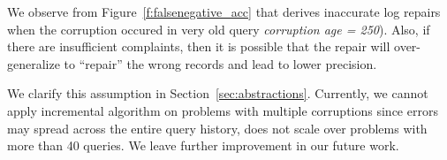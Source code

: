 \begin{quote}
\end{quote}

We observe from Figure~\ref{f:falsenegative_acc} that \sys derives inaccurate log repairs when the corruption occured in 
very old query  \textit{corruption age = 250}). Also, if there are insufficient complaints, then it is possible that the 
repair will over-generalize to  ``repair'' the wrong records and lead to lower precision.

 

\begin{quote}
\end{quote}

We clarify this assumption in Section~\ref{sec:abstractions}. Currently, we cannot apply incremental algorithm 
on problems with multiple corruptions since errors may spread across the entire query history, \sys 
does not scale over problems with more than 40 queries. We leave further improvement in our future work.



